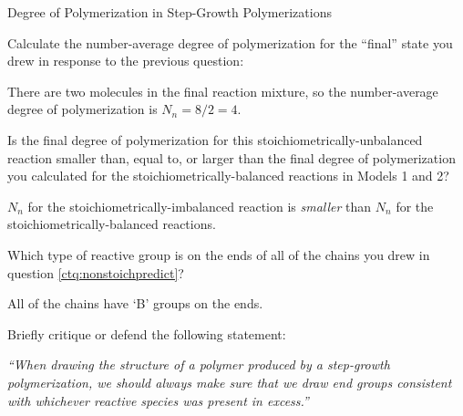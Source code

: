 \begin{activity}{Degree of Polymerization in Step-Growth Polymerizations}
\begin{ctqs}
		\question Calculate the number-average degree of polymerization for the ``final'' state you drew in response to the previous question:
		
		\begin{solution}[1in]
			There are two molecules in the final reaction mixture, so the number-average degree of polymerization is $N_n = 8/2 = 4$.
		\end{solution}
		
		\question Is the final degree of polymerization for this stoichiometrically-unbalanced reaction smaller than, equal to, or larger than the final degree of polymerization you calculated for the stoichiometrically-balanced reactions in Models 1 and 2?
		
		\begin{solution}[1in]
			$N_n$ for the stoichiometrically-imbalanced reaction is \emph{smaller} than $N_n$ for the stoichiometrically-balanced reactions.
		\end{solution}
		
		\question Which type of reactive group is on the ends of all of the chains you drew in question \ref{ctq:nonstoichpredict}?
		
		\begin{solution}[0.5in]
			All of the chains have `B' groups on the ends.
		\end{solution}
		
		\question Briefly critique or defend the following statement:
		
			\emph{``When drawing the structure of a polymer produced by a step-growth polymerization, we should always make sure that we draw end groups consistent with whichever reactive species was present in excess.''}
		
		\begin{solution}[1.85in]
		\end{solution}
			

\end{ctqs}
\end{activity}
